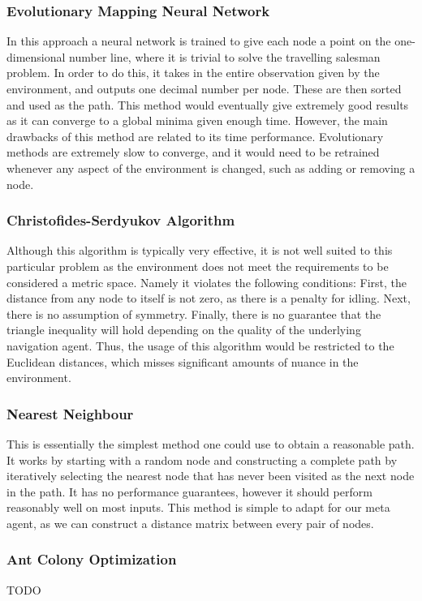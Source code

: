 \documentclass{article}
\begin{document}
\subsubsection{Evolutionary Mapping Neural Network}
In this approach a neural network is trained to give each node a point on the one-dimensional number line, where it is trivial to solve the travelling salesman problem. In order to do this, it takes in the entire observation given by the environment, and outputs one decimal number per node. These are then sorted and used as the path. This method would eventually give extremely good results as it can converge to a global minima given enough time. However, the main drawbacks of this method are related to its time performance. Evolutionary methods are extremely slow to converge, and it would need to be retrained whenever any aspect of the environment is changed, such as adding or removing a node.

\subsubsection{Christofides-Serdyukov Algorithm}
Although this algorithm is typically very effective, it is not well suited to this particular problem as the environment does not meet the requirements to be considered a metric space. Namely it violates the following conditions: First, the distance from any node to itself is not zero, as there is a penalty for idling. Next, there is no assumption of symmetry. Finally, there is no guarantee that the triangle inequality will hold depending on the quality of the underlying navigation agent. Thus, the usage of this algorithm would be restricted to the Euclidean distances, which misses significant amounts of nuance in the environment.

\subsubsection{Nearest Neighbour}
This is essentially the simplest method one could use to obtain a reasonable path. It works by starting with a random node and constructing a complete path by iteratively selecting the nearest node that has never been visited as the next node in the path. It has no performance guarantees, however it should perform reasonably well on most inputs. This method is simple to adapt for our meta agent, as we can construct a distance matrix between every pair of nodes.

\subsubsection{Ant Colony Optimization}
TODO
\end{document}
